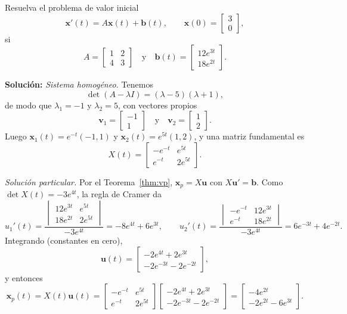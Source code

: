 \begin{example}\label{ex:vp-pvi}
Resuelva el problema de valor inicial
\[
\mathbf{x}'(t) = A\mathbf{x}(t) + \mathbf{b}(t), \qquad \mathbf{x}(0) = \begin{bmatrix} 3 \\ 0 \end{bmatrix},
\]
si
\[
A = \begin{bmatrix} 1 & 2 \\ 4 & 3 \end{bmatrix} \quad \text{y} \quad \mathbf{b}(t) = \begin{bmatrix} 12e^{3t} \\ 18e^{2t} \end{bmatrix}.
\]

\noindent \textbf{Soluci\'on:} \emph{Sistema homog\'eneo.} Tenemos
\[
\det(A - \lambda I) = (\lambda - 5)(\lambda + 1),
\]
de modo que $\lambda_1 = -1$ y $\lambda_2 = 5$, con vectores propios
\[
\mathbf{v}_1 = \begin{bmatrix} -1 \\ 1 \end{bmatrix} \quad \text{y} \quad \mathbf{v}_2 = \begin{bmatrix} 1 \\ 2 \end{bmatrix}.
\]
Luego $\mathbf{x}_1(t) = e^{-t}(-1,1)$ y $\mathbf{x}_2(t) = e^{5t}(1,2)$, y una matriz fundamental es
\[
X(t) = \begin{bmatrix} -e^{-t} & e^{5t} \\ e^{-t} & 2e^{5t} \end{bmatrix}.
\]

\emph{Soluci\'on particular.} Por el Teorema~\ref{thm:vp}, $\mathbf{x}_p = X\mathbf{u}$ con $X\mathbf{u}' = \mathbf{b}$. Como $\det X(t) = -3e^{4t}$, la regla de Cramer da
\[
u_1'(t) = \frac{\begin{vmatrix} 12e^{3t} & e^{5t} \\ 18e^{2t} & 2e^{5t} \end{vmatrix}}{-3e^{4t}} = -8e^{4t} + 6e^{3t}, \qquad
u_2'(t) = \frac{\begin{vmatrix} -e^{-t} & 12e^{3t} \\ e^{-t} & 18e^{2t} \end{vmatrix}}{-3e^{4t}} = 6e^{-3t} + 4e^{-2t}.
\]
Integrando (constantes en cero),
\[
\mathbf{u}(t) = \begin{bmatrix} -2e^{4t} + 2e^{3t} \\ -2e^{-3t} - 2e^{-2t} \end{bmatrix},
\]
y entonces
\[
\mathbf{x}_p(t) = X(t)\mathbf{u}(t) = \begin{bmatrix} -e^{-t} & e^{5t} \\ e^{-t} & 2e^{5t} \end{bmatrix} \begin{bmatrix} -2e^{4t} + 2e^{3t} \\ -2e^{-3t} - 2e^{-2t} \end{bmatrix} = \begin{bmatrix} -4e^{2t} \\ -2e^{2t} - 6e^{3t} \end{bmatrix}.
\]


\end{example}
